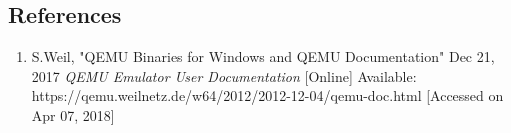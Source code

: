 \documentclass[english,10pt,letterpaper,onecolumn]{IEEEtran}
\begin{document}
\subsection*{\bf References}
\begin{enumerate}
\item S.Weil, "QEMU Binaries for Windows and QEMU Documentation" Dec 21, 2017 {\textit {QEMU Emulator User Documentation}} [Online] Available: https://qemu.weilnetz.de/w64/2012/2012-12-04/qemu-doc.html [Accessed on Apr 07, 2018]
\end{enumerate}
\end{document}
